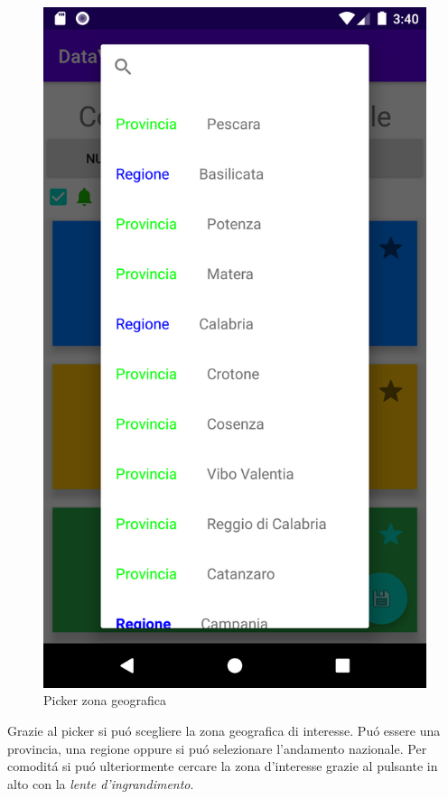 \documentclass{article}
\begin{document}
    \begin{figure}[h]
        \centering
        \includegraphics[width=.5\linewidth]{DPC_geo_picker.png}
        \caption{Picker zona geografica}
        \label{fig3}
    \end{figure}

    Grazie al picker si puó scegliere la zona geografica di interesse. Puó essere una provincia, una regione oppure si puó selezionare l'andamento nazionale.
    Per comoditá si puó ulteriormente cercare la zona d'interesse grazie al pulsante in alto con la \emph{lente d'ingrandimento}.
\end{document}
